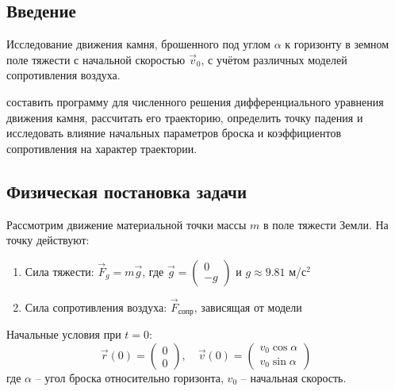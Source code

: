 \newpage

\begin{center}
    \section{Введение}
\end{center}

\Task Исследование движения камня, брошенного под углом $\alpha$ к горизонту в земном поле тяжести с начальной скоростью $\vec{v}_0$, с учётом различных моделей сопротивления воздуха.

\Goal составить программу для численного решения дифференциального уравнения движения камня, рассчитать его траекторию, определить точку падения и исследовать влияние начальных параметров броска и коэффициентов сопротивления на характер траектории.

\begin{center}
    \section{Физическая постановка задачи}
\end{center}
\vspace{-2em}
Рассмотрим движение материальной точки массы $m$ в поле тяжести Земли. На точку действуют:
\begin{enumerate}
    \item Сила тяжести: $\vec{F}_g = m\vec{g}$, где $\vec{g} = \begin{pmatrix} 0 \\ -g \end{pmatrix}$ и $g \approx 9.81$ м/с$^2$
    \item Сила сопротивления воздуха: $\vec{F}_{\text{сопр}}$, зависящая от модели
\end{enumerate}

Начальные условия при $t = 0$:
\[
\vec{r}(0) = \begin{pmatrix} 0 \\ 0 \end{pmatrix}, \quad \vec{v}(0) = \begin{pmatrix} v_0 \cos\alpha \\ v_0 \sin\alpha \end{pmatrix}
\]
где $\alpha$ -- угол броска относительно горизонта, $v_0$ -- начальная скорость.

\newpage
